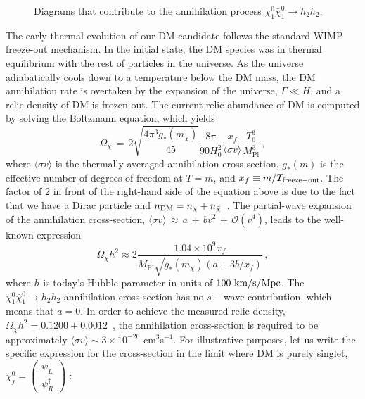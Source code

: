 \documentclass[12pt,letterpaper]{article}
\begin{document}
\begin{figure}
\caption{Diagrams that contribute to the annihilation process $\chi_1^0\bar{\chi}_1^0\to h_2h_2$.}
\label{fig:DM-Annihilation}
\end{figure}

The early thermal evolution of our DM candidate follows the standard WIMP freeze-out mechanism. In the initial state, the DM species was in thermal equilibrium with the rest of particles in the universe. As the universe adiabatically cools down to a temperature below the DM mass, the DM annihilation rate is overtaken by the expansion of the universe, $\Gamma \ll H$, and a relic density of DM is frozen-out. The current relic abundance of DM is computed by solving the Boltzmann equation, which yields~\cite{Kolb:1990vq}
\begin{equation}
\Omega_\chi \,=\,2\sqrt{\frac{4 \pi^{3} g_{*}(m_\chi)}{45}} \frac{8 \pi}{90 H_{0}^{2}} \frac{x_{f}}{\langle\sigma v\rangle} \frac{T_{0}^{3}}{M_{\mathrm{Pl}}^{3}}\,,
\end{equation} where $\langle\sigma v\rangle$ is the thermally-averaged annihilation cross-section, $g_*(m)$ is the effective number of degrees of freedom at $T=m$, and $x_f\equiv m/T_{\rm freeze-out}$. The factor of $2$ in front of the right-hand side of the equation above is due to the fact that we have a Dirac particle and $n_{\rm DM}= n_{\chi}+n_{\bar{\chi}}$~\cite{Srednicki:1988ce}. The partial-wave expansion of the annihilation cross-section, $\langle \sigma v\rangle \, \approx\, a\,+\,b v^2\,+\,\mathcal{O}(v^4)$, leads to the well-known expression
\begin{equation}
\label{eq:RelicAbundance}
\Omega_{\chi} h^{2} \approx 2\frac{1.04 \times 10^{9} x_{f}}{M_{\mathrm{Pl}} \sqrt{g_{*}(m_\chi)}\left(a+3 b / x_{f}\right)}\,,
\end{equation}
where $h$ is today's Hubble parameter in units of $100~{\rm km/s/Mpc}$. The $\chi_1^0\bar{\chi}_1^0\to h_2h_2$ annihilation cross-section has no $s-$wave contribution, which means that $a=0$. In order to achieve the measured relic density, $\Omega_{\chi} h^{2} =0.1200 \pm 0.0012$~\cite{Aghanim:2018eyx}, the annihilation cross-section is required to be approximately $\langle \sigma v \rangle\sim 3\times 10^{-26}$ cm$^{3}$s$^{-1}$. For illustrative purposes, let us write the specific expression for the cross-section in the limit where DM is purely singlet, $\chi^0_j = \left( \begin{array}{l}{\psi_L} \\ {\psi_R^\dagger}\end{array}\right) $ :
\end{document}
